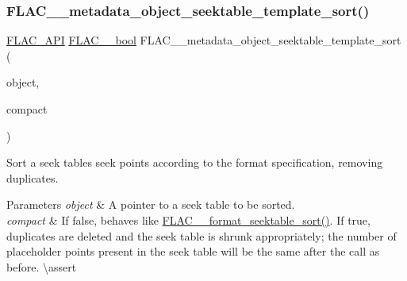 \subsubsection{\texorpdfstring{FLAC\_\_metadata\_object\_seektable\_template\_sort()}{FLAC\_\_metadata\_object\_seektable\_template\_sort()}}
{\footnotesize\ttfamily \mbox{\hyperlink{group__flac__export_ga56ca07df8a23310707732b1c0007d6f5}{F\+L\+A\+C\+\_\+\+A\+PI}} \mbox{\hyperlink{ordinals_8h_a95103469f1cbd78b8cf250194985b34e}{F\+L\+A\+C\+\_\+\+\_\+bool}} F\+L\+A\+C\+\_\+\+\_\+metadata\+\_\+object\+\_\+seektable\+\_\+template\+\_\+sort (\begin{DoxyParamCaption}\item[{\mbox{\hyperlink{struct_f_l_a_c_____stream_metadata}{F\+L\+A\+C\+\_\+\+\_\+\+Stream\+Metadata}} $\ast$}]{object,  }\item[{\mbox{\hyperlink{ordinals_8h_a95103469f1cbd78b8cf250194985b34e}{F\+L\+A\+C\+\_\+\+\_\+bool}}}]{compact }\end{DoxyParamCaption})}

Sort a seek table\textquotesingle{}s seek points according to the format specification, removing duplicates.


\begin{DoxyParams}{Parameters}
{\em object} & A pointer to a seek table to be sorted. \\
\hline
{\em compact} & If {\ttfamily false}, behaves like \mbox{\hyperlink{group__flac__format_gad1b0090d45a6d65a696a81261bd7fbf6}{F\+L\+A\+C\+\_\+\+\_\+format\+\_\+seektable\+\_\+sort()}}. If {\ttfamily true}, duplicates are deleted and the seek table is shrunk appropriately; the number of placeholder points present in the seek table will be the same after the call as before. \textbackslash{}assert 
\begin{DoxyCode}{1}
\end{DoxyCode}
 
\begin{DoxyCode}{1}
\end{DoxyCode}
 \\
\hline
\end{DoxyParams}

